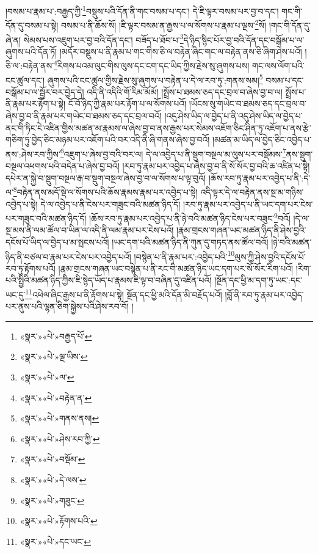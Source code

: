།བསམ་པ་རྣམ་པ་:བརྒྱད་ཀྱི་\footnote{«སྣར་»«པེ་»བརྒྱད་པོ་}བསྡུས་པའི་དོན་ནི་གང་བསམ་པ་དང་། དེ་ཇི་ལྟར་བསམ་པར་བྱ་བ་དང་། གང་གི་དོན་དུ་བསམ་པ་སྟེ། བསམ་པ་ནི་ཆོས་སོ། །ཇི་ལྟར་བསམ་ན་རྒྱས་པ་ལ་སོགས་པ་རྣམ་པ་ལྔས་\footnote{«སྣར་»«པེ་»ལྔ་ཡིས་}སོ། །གང་གི་དོན་དུ་ཞེ་ན། སེམས་པས་འཇུག་པར་བྱ་བའི་དོན་དང་། བཟོད་པ་ཐོབ་པ་\footnote{«སྣར་»«པེ་»ལ་}དེ་ཉིད་སྙིང་པོར་བྱ་བའི་དོན་དང་བསྒོམ་པ་ལ་ཞུགས་པའི་དོན་ཏོ། །མདོར་བསྡུས་པ་ནི་རྣམ་པ་གང་གིས་ཅི་ལ་བརྟེན་ཞིང་གང་ལ་བརྟེན་ནས་ཅི་ཞིག་ཤེས་པའོ། །ཅི་ལ་:བརྟེན་ནས་\footnote{«སྣར་»«པེ་»བརྟེན་ན་}རིགས་པའམ་ལུང་གིས་ལུས་དང་ངག་དང་ཡིད་ཀྱིས་རྗེས་སུ་ཞུགས་པས། གང་ལས་ལོག་པའི་ངང་ཚུལ་དང་། ཞུགས་པའི་ངང་ཚུལ་གྱིས་རྗེས་སུ་ཞུགས་པ་བརྟེན་པ་དེ་ལ་རབ་ཏུ་:གནས་སམ།\footnote{«སྣར་»«པེ་»གནས་ནས།} བསམ་པ་དང་བསྒོམ་པ་ལ་སྦྱོར་བར་བྱེད་དེ། འདི་ནི་འདིའི་གོ་རིམ་མོམོ། །སྤྲོས་པ་ཐམས་ཅད་དང་བྲལ་བ་ཞེས་བྱ་བ་ལ། སྤྲོས་པ་ནི་རྣམ་པར་རྟོག་པ་སྟེ། ངོ་བོ་ཉིད་ཀྱི་རྣམ་པར་རྟོག་པ་ལ་སོགས་པའོ། །ཡོངས་སུ་གཡེང་བ་ཐམས་ཅད་དང་བྲལ་བ་ཞེས་བྱ་བ་ནི་རྣམ་པར་གཡེང་བ་ཐམས་ཅད་དང་བྲལ་བའོ། །འདུ་ཤེས་ཡིད་ལ་བྱེད་པ་ནི་འདུ་ཤེས་ཡིད་ལ་བྱེད་པ་ནང་གི་ཏིང་ངེ་འཛིན་གྱིས་མཚན་མ་རྣམས་ལ་ཞེས་བྱ་བ་ནས་རྒྱས་པར་སེམས་འཇོག་ཅིང་ཤིན་ཏུ་འཇོག་པ་ནས་རྩེ་གཅིག་ཏུ་བྱེད་ཅིང་མཉམ་པར་འཇོག་པའི་བར་འདི་ནི་ཞི་གནས་ཞེས་བྱ་བའོ། །མཚན་མ་ཡིད་ལ་བྱེད་ཅིང་འབྱེད་པ་ནས་:ཤེས་རབ་ཀྱིས་\footnote{«སྣར་»«པེ་»ཤེས་རབ་ཀྱི་}འཇུག་པ་ཞེས་བྱ་བའི་བར་ལ། དེ་ལ་འབྱེད་པ་ནི་སྡུག་བསྔལ་མ་ལུས་པར་བསྡོམས་\footnote{«སྣར་»«པེ་»བསྡོམ་}ནས་སྡུག་བསྔལ་འཕགས་པའི་བདེན་པ་ཞེས་བྱ་བའོ། །རབ་ཏུ་རྣམ་པར་འབྱེད་པ་ཞེས་བྱ་བ་ནི་སོ་སོར་བྱ་བའི་ཆ་འཛིན་པ་སྟེ། དཔེར་ན་སྐྱེ་བ་སྡུག་བསྔལ་རྒ་བ་སྡུག་བསྔལ་ཞེས་བྱ་བ་ལ་སོགས་པ་ལྟ་བུའོ། །ཆོས་རབ་ཏུ་རྣམ་པར་འབྱེད་པ་ནི་:དེ་ལ་\footnote{«སྣར་»«པེ་»དེ་ལས་}བརྟེན་ནས་མདོ་སྡེ་ལ་སོགས་པའི་ཆོས་རྣམས་རྣམ་པར་འབྱེད་པ་སྟེ། འདི་ལྟར་དེ་ལ་བརྟེན་ནས་སྔ་མ་གཉིས་འབྱེད་པ་སྟེ། དེ་ལ་འབྱེད་པ་ནི་ངེས་པར་གཟུང་བའི་མཚན་ཉིད་དོ། །རབ་ཏུ་རྣམ་པར་འབྱེད་པ་ནི་ཡང་དག་པར་ངེས་པར་གཟུང་བའི་མཚན་ཉིད་དོ། །ཆོས་རབ་ཏུ་རྣམ་པར་འབྱེད་པ་ནི་ཉེ་བའི་མཚན་ཉིད་ངེས་པར་བཟུང་\footnote{«སྣར་»«པེ་»གཟུང་}བའོ། །དེ་ལ་སྔ་མས་ནི་ལམ་ཚོལ་བ་ཡིན་ལ་འདི་ནི་ལམ་རྣམ་པར་ངེས་པའོ། །རྣམ་གྲངས་གཞན་ཡང་མཚན་ཉིད་ནི་ཤེས་བྱའི་དངོས་པོ་ཡིད་ལ་བྱེད་པ་མ་སྤངས་པའོ། །ཡང་དག་པའི་མཚན་ཉིད་ནི་ཀུན་དུ་གཏད་ནས་ཚོལ་བའོ། །ཉེ་བའི་མཚན་ཉིད་ནི་བཙལ་བ་རྣམ་པར་ངེས་པར་འབྱེད་པའོ། །བསྙེན་པ་ནི་རྣམ་པར་:འབྱེད་པའི་\footnote{«སྣར་»«པེ་»རྟོགས་པའི་}ལུས་ཀྱི་ཤེས་བྱའི་དངོས་པོ་རབ་ཏུ་རྟོགས་པའོ། །རྣམ་གྲངས་གཞན་ཡང་བསྙེན་པ་ནི་རང་གི་མཚན་ཉིད་ཡང་དག་པར་སོ་སོར་རིག་པའོ། །རིག་པའི་སྤྱིའི་མཚན་ཉིད་ཀྱིས་ཇི་སྙེད་ཡོད་པ་རྣམས་ཇི་ལྟ་བ་བཞིན་དུ་འཛིན་པའོ། །སྔོན་དང་ཕྱི་མ་དག་ཏུ་ཡང་:དང་ཡང་དུ་\footnote{«སྣར་»«པེ་»དང་ཡང་}འཕེལ་ཞིང་རྒྱས་པ་ནི་རྟོགས་པ་སྟེ། སྔོན་དང་ཕྱི་མའི་དོན་མི་བརྗོད་པའོ། །བློ་ནི་རབ་ཏུ་རྣམ་པར་འབྱེད་པར་ནུས་པའི་ལྷན་ཅིག་སྐྱེས་པའི་ཤེས་རབ་བོ། །
